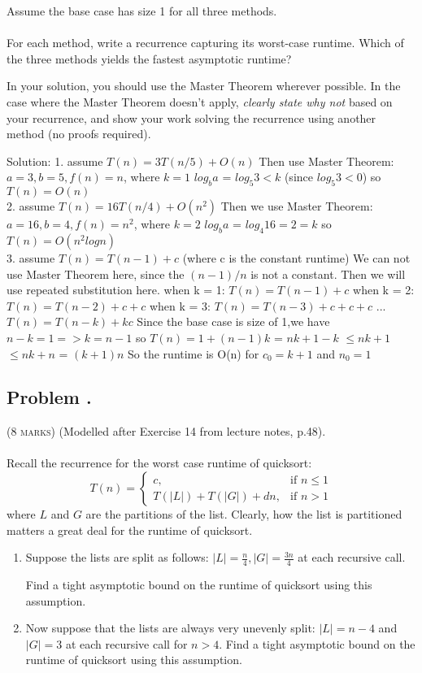 \documentclass[12pt]{article}
\newcounter{ProblemNum}
\renewcommand{\theProblemNum}{\arabic{ProblemNum}}
\newcommand*{\anyproblem}[1]{\newpage\subsection*{#1}}
\newcommand*{\problem}[1]{\stepcounter{ProblemNum} %
\anyproblem{Problem \theProblemNum. \; #1}}
\begin{document}
Assume the base case has size 1 for all three methods.\\ \\
For each method, write a recurrence capturing its worst-case runtime.
Which of the three methods yields the fastest asymptotic runtime? 

In your solution, you should use the Master Theorem wherever possible. In the case where the Master Theorem doesn't apply, \emph{clearly state why not} based on your recurrence, and show your work solving the recurrence using another method (no proofs required).\vskip5pt 


Solution: \vskip5pt
1. assume $T(n) = 3T(n/5) + O(n)$\vskip5pt
Then use Master Theorem:\vskip5pt
$a = 3, b = 5, f(n) = n$, where $k = 1$\vskip5pt
$log_{b}a$ = $log_{5}3 < k $ (since $log_{5}3 <0$)\vskip5pt
so $T(n) = O(n)$ \\[2ex]

2. assume $T(n) = 16T(n/4) + O(n^2)$\vskip5pt
Then we use Master Theorem:\vskip5pt
$a = 16, b = 4, f(n) = n^2$, where $k=2$\vskip5pt
$log_{b}a$ = $log_{4}16 = 2 = k $\vskip5pt
so $T(n) = O(n^2log n)$\\[2ex]

3. assume $T(n) = T(n-1) + c$ (where c is the constant runtime)\vskip5pt
We can not use Master Theorem here, since the $(n-1)/n$ is not a constant.\vskip5pt
Then we will use repeated substitution here.\vskip5pt
when k = 1: $T(n) = T(n-1) + c$\vskip5pt
when k = 2: $T(n) = T(n-2) + c + c$\vskip5pt
when k = 3: $T(n) = T(n-3) + c + c + c$\vskip5pt
\qquad \qquad ...\vskip5pt
$T(n) = T(n-k) + kc$\vskip5pt
Since the base case is size of 1,we have $n-k = 1 => k = n-1$\vskip5pt
so $T(n) = 1 + (n-1)k$\vskip5pt
\qquad = $nk + 1 - k$\vskip5pt
\qquad $\le nk + 1$\vskip5pt
\qquad $\le nk+n$ = $(k+1)n$\vskip5pt
So the runtime is O(n) for $c_0 = k+1$ and $n_0 = 1$



\problem{}
\textsc{(8 marks)} (Modelled after Exercise 14 from lecture notes, p.48).\\ \\
	Recall the recurrence for the worst case runtime of quicksort:
	\[
	T(n) = 
	\begin{cases}
	c, & \text{if } n \leq 1\\
	T(|L|) + T(|G|) + dn, & \text{if } n > 1
	\end{cases}
           \]
	where $L$ and $G$ are the partitions of the list. Clearly, how the list is partitioned matters a great deal for the runtime of quicksort.
	\begin{enumerate}
		\item 
		Suppose the lists are split as follows: $|L| = \frac{n}{4},  |G| = \frac{3n}{4}$ at each recursive call.
    
    Find a tight asymptotic bound on the runtime of quicksort using this assumption.
		\item 
		Now suppose that the lists are always very unevenly split: $|L| = n-4$ and $|G| = 3$ at each recursive call for $n>4$. Find a tight asymptotic bound on the runtime of quicksort using this assumption.
	\end{enumerate}\vskip5pt
	
\end{document}
